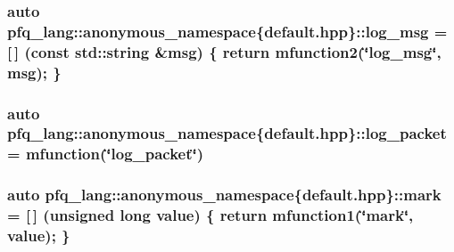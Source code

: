 \hypertarget{namespacepfq__lang_1_1anonymous__namespace_02default_8hpp_03_a6e8f4a76ce585b69d5de50cfa6a08f8a}{
\subsubsection[{log\+\_\+msg}]{\setlength{\rightskip}{0pt plus 5cm}auto pfq\+\_\+lang\+::anonymous\+\_\+namespace\{default.\+hpp\}\+::log\+\_\+msg = \mbox{[}$\,$\mbox{]} (const std\+::string \&msg) \{ return {\bf mfunction2}(\char`\"{}log\+\_\+msg\char`\"{}, msg); \}}}\label{namespacepfq__lang_1_1anonymous__namespace_02default_8hpp_03_a6e8f4a76ce585b69d5de50cfa6a08f8a}
\hypertarget{namespacepfq__lang_1_1anonymous__namespace_02default_8hpp_03_a82a9b0e4c53eb28a98e5c34372a5b17b}{
\subsubsection[{log\+\_\+packet}]{\setlength{\rightskip}{0pt plus 5cm}auto pfq\+\_\+lang\+::anonymous\+\_\+namespace\{default.\+hpp\}\+::log\+\_\+packet = {\bf mfunction}(\char`\"{}log\+\_\+packet\char`\"{})}}\label{namespacepfq__lang_1_1anonymous__namespace_02default_8hpp_03_a82a9b0e4c53eb28a98e5c34372a5b17b}
\hypertarget{namespacepfq__lang_1_1anonymous__namespace_02default_8hpp_03_ad6142fe3a0fc859f25ea16956f52a5f0}{
\subsubsection[{mark}]{\setlength{\rightskip}{0pt plus 5cm}auto pfq\+\_\+lang\+::anonymous\+\_\+namespace\{default.\+hpp\}\+::mark = \mbox{[}$\,$\mbox{]} (unsigned long value) \{ return {\bf mfunction1}(\char`\"{}mark\char`\"{}, value); \}}}\label{namespacepfq__lang_1_1anonymous__namespace_02default_8hpp_03_ad6142fe3a0fc859f25ea16956f52a5f0}

